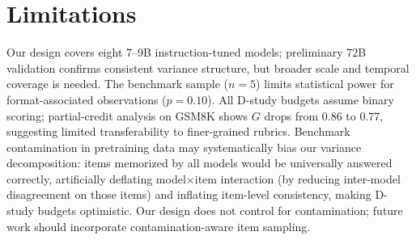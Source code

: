 \section*{Limitations}

Our design covers eight 7--9B instruction-tuned models; preliminary 72B validation confirms consistent variance structure, but broader scale and temporal coverage is needed. The benchmark sample ($n = 5$) limits statistical power for format-associated observations ($p = 0.10$). All D-study budgets assume binary scoring; partial-credit analysis on GSM8K shows $G$ drops from 0.86 to 0.77, suggesting limited transferability to finer-grained rubrics. Benchmark contamination in pretraining data may systematically bias our variance decomposition: items memorized by all models would be universally answered correctly, artificially deflating model$\times$item interaction (by reducing inter-model disagreement on those items) and inflating item-level consistency, making D-study budgets optimistic. Our design does not control for contamination; future work should incorporate contamination-aware item sampling.

